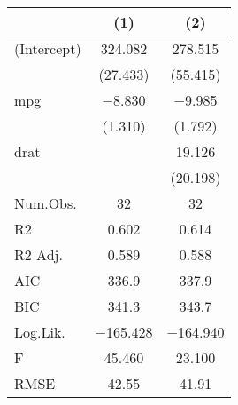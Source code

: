 \begin{table}
\centering
\begin{tabular}[t]{lcc}
\toprule
  & (1) & (2)\\
\midrule
(Intercept) & \num{324.082} & \num{278.515}\\
 & (\num{27.433}) & (\num{55.415})\\
mpg & \num{-8.830} & \num{-9.985}\\
 & (\num{1.310}) & (\num{1.792})\\
drat &  & \num{19.126}\\
 &  & (\num{20.198})\\
\midrule
Num.Obs. & \num{32} & \num{32}\\
R2 & \num{0.602} & \num{0.614}\\
R2 Adj. & \num{0.589} & \num{0.588}\\
AIC & \num{336.9} & \num{337.9}\\
BIC & \num{341.3} & \num{343.7}\\
Log.Lik. & \num{-165.428} & \num{-164.940}\\
F & \num{45.460} & \num{23.100}\\
RMSE & \num{42.55} & \num{41.91}\\
\bottomrule
\end{tabular}
\end{table}
